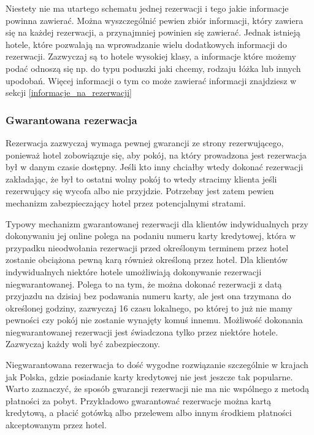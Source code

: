 \documentclass[a4paper,onecolumn,oneside,11pt,wide,floatssmall]{mwrep}
\theoremstyle{definition}
\theoremstyle{plain}%
\theoremstyle{remark}
\begin{document}
Niestety nie ma utartego schematu jednej rezerwacji i tego jakie informacje
powinna zawierać. Można wyszczególnić pewien zbiór informacji, który zawiera się
na każdej rezerwacji, a przynajmniej powinien się zawierać. Jednak istnieją
hotele, które pozwalają na wprowadzanie wielu dodatkowych informacji do
rezerwacji. Zazwyczaj są to hotele wysokiej klasy, a informacje które możemy
podać odnoszą się np. do typu poduszki jaki chcemy, rodzaju łóżka lub innych
upodobań. Więcej informacji o tym co może zawierać informacji znajdziesz w
sekcji \ref{informacje_na_rezerwacji}


\subsubsection{Gwarantowana rezerwacja}
Rezerwacja zazwyczaj wymaga pewnej gwarancji ze strony rezerwującego, ponieważ
hotel zobowiązuje się, aby pokój, na który prowadzona jest rezerwacja
był w danym czasie dostępny. Jeśli kto inny chciałby wtedy dokonać rezerwacji 
zakładając, że był to ostatni wolny pokój to wtedy stracimy klienta jeśli 
rezerwujący się wycofa albo nie przyjdzie. Potrzebny jest zatem pewien  
mechanizm zabezpieczający hotel przez potencjalnymi stratami. 

Typowy mechanizm gwarantowanej rezerwacji dla klientów indywidualnych przy dokonywaniu 
jej online polega na podaniu numeru karty kredytowej, która w przypadku 
nieodwołania rezerwacji przed określonym terminem przez hotel zostanie obciążona pewną karą 
również określoną przez hotel. Dla klientów indywidualnych niektóre hotele 
umożliwiają dokonywanie rezerwacji niegwarantowanej. Polega to na tym, 
że można dokonać rezerwacji z datą przyjazdu na dzisiaj bez podawania 
numeru karty, ale jest ona trzymana do określonej godziny, 
zazwyczaj 16 czasu lokalnego, po której to już nie mamy pewności 
czy pokój nie zostanie wynajęty komuś innemu. Możliwość dokonania
niegwarantowanej rezerwacji jest świadczona tylko przez niektóre hotele.
Zazwyczaj każdy woli być zabezpieczony. 

Niegwarantowana rezerwacja to dość wygodne rozwiązanie szczególnie w krajach jak
Polska, gdzie posiadanie karty kredytowej nie jest jeszcze tak popularne. Warto zaznaczyć, że sposób gwarancji rezerwacji 
nie ma nic wspólnego z metodą płatności za pobyt. Przykładowo gwarantować
rezerwacje można kartą kredytową, a płacić gotówką albo przelewem albo innym
środkiem płatności akceptowanym przez hotel.
\end{document}
